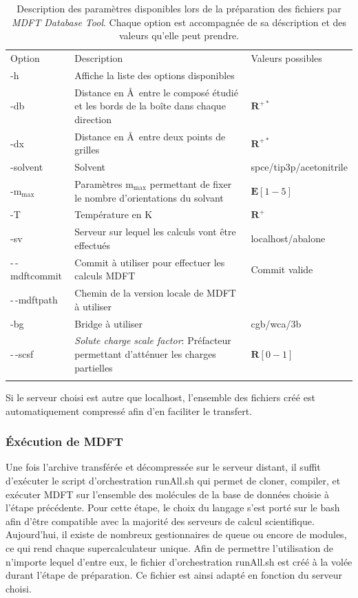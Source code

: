 \begin{table}
  \begin{tabular}{ l p{10cm} p{4cm}}
    \hline & \\[-1em]\hline
    Option   & Description  & Valeurs possibles \\
    \hline
    -h  & Affiche la liste des options disponibles & \\
    -db & Distance en \AA\ entre le composé étudié et les bords de la boîte dans chaque direction & $\mathbf{R}^{+*}$ \\
    -dx & Distance en \AA\ entre deux points de grilles & $\mathbf{R}^{+*}$ \\
    -solvent & Solvent & spce/tip3p/acetonitrile\\
    -$\mathrm{m}_\mathrm{max}$ & Paramètres $\mathrm{m}_\mathrm{max}$ permettant de fixer le nombre d'orientations du solvant & $\mathbf{E}[1-5]$ \\
    -T & Température en K & $\mathbf{R}^{+}$ \\
    -sv & Serveur sur lequel les calculs vont être effectués & localhost/abalone \\
    -\,-mdftcommit & Commit à utiliser pour effectuer les calculs MDFT & Commit valide \\
    -\,-mdftpath & Chemin de la version locale de MDFT à utiliser & \\
    -bg & Bridge à utiliser & cgb/wca/3b \\
    -\,-scsf & \textit{Solute charge scale factor}: Préfacteur permettant d'atténuer les charges partielles & $\mathbf{R}[0-1]$ \\
    \hline & \\[-1em]\hline
  \end{tabular}
  \caption[Description des paramètres disponibles lors de la préparation des fichiers par \textit{MDFT Database Tool}.]{Description des paramètres disponibles lors de la préparation des fichiers par \textit{MDFT Database Tool}. Chaque option est accompagnée de sa déscription et des valeurs qu'elle peut prendre.}
  \label{tab:processParameters}  
\end{table}

Si le serveur choisi est autre que localhost, l'ensemble des fichiers créé est automatiquement compressé afin d'en faciliter le transfert.


\subsubsection{\'Exécution de MDFT}
Une fois l'archive transférée et décompressée sur le serveur distant, il suffit d’exécuter le script d'orchestration runAll.sh qui permet de cloner, compiler, et exécuter MDFT sur l'ensemble des molécules de la base de données choisie à l'étape précédente. Pour cette étape, le choix du langage s'est porté sur le bash afin d'être compatible avec la majorité des serveurs de calcul scientifique. Aujourd'hui, il existe de nombreux gestionnaires de queue ou encore de modules, ce qui rend chaque supercalculateur unique. Afin de permettre l'utilisation de n'importe lequel d'entre eux, le fichier d'orchestration runAll.sh est créé à la volée durant l'étape de préparation. Ce fichier est ainsi adapté en fonction du serveur choisi.


